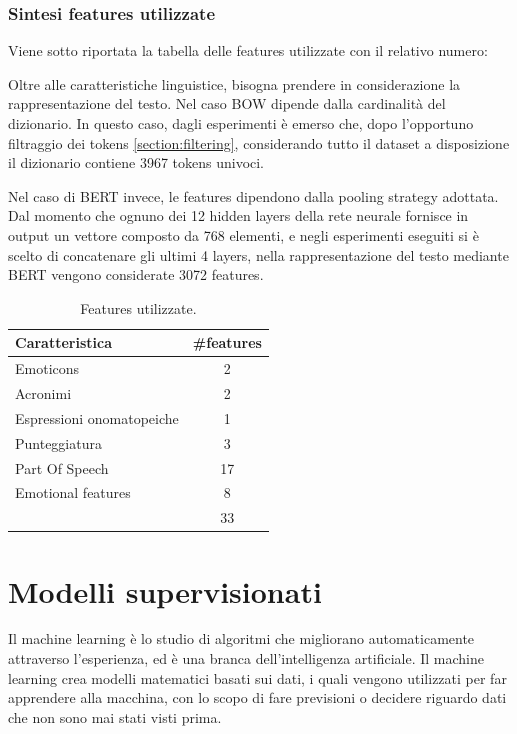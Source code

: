 \documentclass[oneside]{book}
\begin{document}
\subsection{Sintesi features utilizzate}
Viene sotto riportata la tabella delle features utilizzate con il relativo numero:

Oltre alle caratteristiche linguistice, bisogna prendere in considerazione la rappresentazione del testo. Nel caso BOW dipende dalla cardinalità del dizionario. In questo caso, dagli esperimenti è emerso che, dopo l'opportuno filtraggio dei tokens \ref{section:filtering}, considerando tutto il dataset a disposizione il dizionario contiene 3967 tokens univoci.

Nel caso di BERT invece, le features dipendono dalla pooling strategy adottata. Dal momento che ognuno dei 12 hidden layers della rete neurale fornisce in output un vettore composto da 768 elementi, e negli esperimenti eseguiti si è scelto di concatenare gli ultimi 4 layers, nella rappresentazione del testo mediante BERT vengono considerate 3072 features.


\begin{table}[H]
	\centering
	\begin{tabular}[t]{l|c}
		\hline
		\textbf{Caratteristica} & \textbf{\#features} \\
		\hline
		Emoticons  			 & 2 \\
		Acronimi & 2 \\
		Espressioni onomatopeiche  & 1 \\
		Punteggiatura & 3 \\
		Part Of Speech & 17 \\
		Emotional features & 8 \\
		\hline
		& 33 \\
		
	\end{tabular}
	\caption{Features utilizzate.}
\end{table}


\chapter{Modelli supervisionati}
\label{chap:supervised-models}

Il machine learning è lo studio di algoritmi che migliorano automaticamente attraverso l'esperienza, ed è una branca dell'intelligenza artificiale. Il machine learning crea modelli matematici basati sui dati, i quali vengono utilizzati per far apprendere alla macchina, con lo scopo di fare previsioni o decidere riguardo dati che non sono mai stati visti prima.
\end{document}
